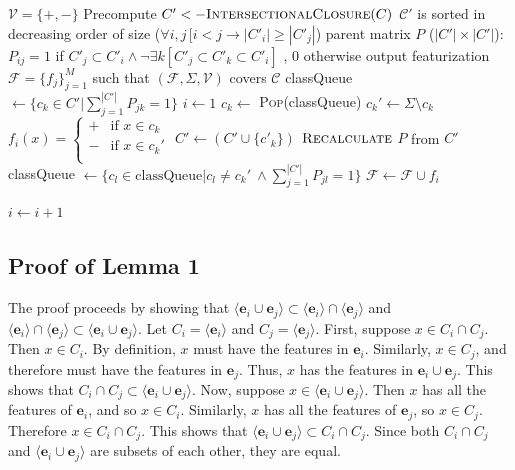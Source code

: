 \documentclass[11pt, oneside]{article}   	%
\begin{document}
\vspace{\baselineskip} \noindent \begin{algorithmic}
	\REQUIRE $\mathcal V = \{ +, - \}$
	\REQUIRE Precompute $C' <- \textsc{IntersectionalClosure}(C)$
	\REQUIRE $\mathcal C'$ is sorted in decreasing order of size ($\forall i, j \, [i < j \rightarrow |C'_i| \geq |C'_j|$)
	\REQUIRE parent matrix $P$ ($|C'| \times |C'|$): $P_{ij} = 1$ if $C'_j \subset C'_i \land \neg \exists k [C'_j \subset C'_k \subset C'_i]$ , $0$ otherwise
	\ENSURE output featurization $\mathcal F = \{ f_j \}_{j=1}^M$ such that $(\mathcal F, \Sigma, \mathcal V)$ covers $\mathcal C$
	\STATE
	\STATE classQueue $\leftarrow \{c_k \in C' | \sum_{j=1}^{|C'|}P_{jk} = 1 \}$
	\STATE $i \leftarrow 1$
	\STATE
	\STATE $c_k \leftarrow$ \textsc{Pop}(classQueue)
	\STATE $c_k' \leftarrow \Sigma \setminus c_k$
	\STATE $f_i(x) = \begin{cases}
	+ & \mbox{if } x \in c_k \\
	- & \mbox{if } x \in c_k' \\
	\end{cases} $
	\STATE $C' \leftarrow (C' \cup \{c'_k\})$
	\STATE $\textsc{Recalculate}$ $ P $ from $C'$
	\STATE classQueue $\leftarrow \{c_l \in \mbox{classQueue} | c_l \not= c_k' \ \land \sum_{j=1}^{|C'|}P_{jl} = 1 \}$
	\STATE $\mathcal F \leftarrow \mathcal F \cup f_i$
	
	\STATE $i \leftarrow i + 1$
	\ENDWHILE
\end{algorithmic}

\appendix

\subsection{Proof of Lemma 1}

The proof proceeds by showing that $\langle \mathbf{e}_i \cup \mathbf{e}_j \rangle \subset  \langle \mathbf{e}_i \rangle \cap \langle \mathbf{e}_j \rangle$ and $ \langle \mathbf{e}_i \rangle \cap \langle \mathbf{e}_j \rangle \subset \langle \mathbf{e}_i \cup \mathbf{e}_j \rangle$.
Let $C_i = \langle \mathbf{e}_i \rangle$ and $C_j = \langle \mathbf{e}_j \rangle$.
First, suppose $x \in C_i \cap C_j$. Then $x \in C_i$. By definition, $x$ must have the features in $\mathbf{e}_i$.
Similarly, $x \in C_j$, and therefore must have the features in $\mathbf{e}_j$.
Thus, $x$ has the features in $\mathbf{e}_i \cup \mathbf{e}_j$. This shows that $C_i \cap C_j \subset \langle \mathbf{e}_i \cup \mathbf{e}_j \rangle$.
Now, suppose $x \in \langle \mathbf{e}_i \cup \mathbf{e}_j \rangle$. Then $x$ has all the features of $\mathbf{e}_i$, and so $x \in C_i$.
Similarly, $x$ has all the features of $\mathbf{e}_j$, so $x \in C_j$. Therefore $x \in C_i \cap C_j$. This shows that $\langle \mathbf{e}_i \cup \mathbf{e}_j \rangle \subset C_i \cap C_j$.
Since both $C_i \cap C_j$ and $\langle \mathbf{e}_i \cup \mathbf{e}_j \rangle$ are subsets of each other, they are equal.
\end{document}
